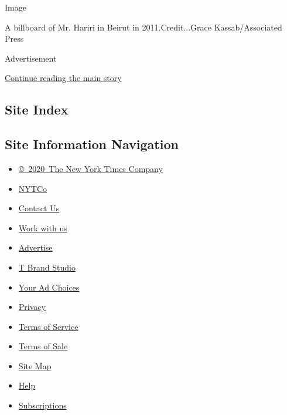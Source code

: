 Image

A billboard of Mr. Hariri in Beirut in 2011.Credit...Grace
Kassab/Associated Press

Advertisement

\protect\hyperlink{after-bottom}{Continue reading the main story}

\hypertarget{site-index}{%
\subsection{Site Index}\label{site-index}}

\hypertarget{site-information-navigation}{%
\subsection{Site Information
Navigation}\label{site-information-navigation}}

\begin{itemize}
\tightlist
\item
  \href{https://help.nytimes.com/hc/en-us/articles/115014792127-Copyright-notice}{©~2020~The
  New York Times Company}
\end{itemize}

\begin{itemize}
\tightlist
\item
  \href{https://www.nytco.com/}{NYTCo}
\item
  \href{https://help.nytimes.com/hc/en-us/articles/115015385887-Contact-Us}{Contact
  Us}
\item
  \href{https://www.nytco.com/careers/}{Work with us}
\item
  \href{https://nytmediakit.com/}{Advertise}
\item
  \href{http://www.tbrandstudio.com/}{T Brand Studio}
\item
  \href{https://www.nytimes.com/privacy/cookie-policy\#how-do-i-manage-trackers}{Your
  Ad Choices}
\item
  \href{https://www.nytimes.com/privacy}{Privacy}
\item
  \href{https://help.nytimes.com/hc/en-us/articles/115014893428-Terms-of-service}{Terms
  of Service}
\item
  \href{https://help.nytimes.com/hc/en-us/articles/115014893968-Terms-of-sale}{Terms
  of Sale}
\item
  \href{https://spiderbites.nytimes.com}{Site Map}
\item
  \href{https://help.nytimes.com/hc/en-us}{Help}
\item
  \href{https://www.nytimes.com/subscription?campaignId=37WXW}{Subscriptions}
\end{itemize}

